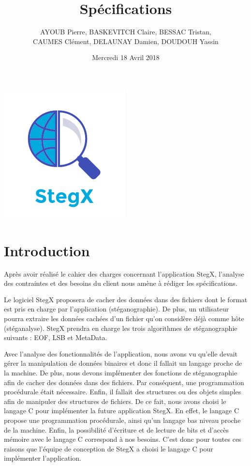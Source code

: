 \documentclass[11pt]{article}
\title{\huge{\textbf Spécifications}}
\author{AYOUB Pierre, BASKEVITCH Claire, BESSAC Tristan, \\
CAUMES Clément, DELAUNAY Damien, DOUDOUH Yassin}
\date{Mercredi 18 Avril 2018}
\begin{document}
\maketitle
\vspace{20em}
\begin{center}\includegraphics{pictures/Application.png}\end{center}
\newpage

\tableofcontents

\newpage

\section{Introduction}

Après avoir réalisé le cahier des charges concernant l'application StegX, 
l'analyse des contraintes et des besoins du client nous amène à rédiger 
les spécifications. 

Le logiciel StegX proposera de cacher des données dans des fichiers 
dont le format est pris en charge par l'application (stéganographie). 
De plus, un utilisateur pourra extraire les données cachées d'un fichier 
qu'on considère déjà comme hôte (stéganalyse). 
StegX prendra en charge les trois algorithmes de stéganographie suivants : 
EOF, LSB et MetaData. 

Avec l'analyse des fonctionnalités de l'application, nous avons vu qu'elle 
devait gérer la manipulation de données binaires et donc il fallait un 
langage proche de la machine. 
De plus, nous devons implémenter des fonctions de stéganographie afin de 
cacher des données dans des fichiers. Par conséquent, une programmation 
procédurale était nécessaire. 
Enfin, il fallait des structures ou des objets simples afin de manipuler 
des structures de fichiers. 
De ce fait, nous avons choisi le langage C pour implémenter la future 
application StegX. En effet, le langage C propose une programmation procédurale, 
ainsi qu'un langage bas niveau proche de la machine. Enfin, la possibilité 
d'écriture et de lecture de bits et d'accès mémoire avec le langage C correspond 
à nos besoins. 
C'est donc pour toutes ces raisons que l'équipe de conception de StegX a 
choisi le langage C pour implémenter l'application. 
\end{document}
